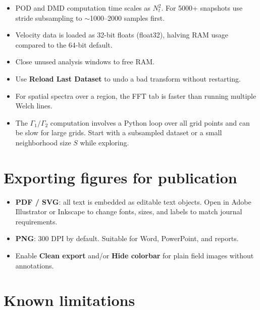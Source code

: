 \documentclass[11pt, a4paper]{report}
\newcommand{\uipth}[1]{\textbf{\textcolor{upblue}{#1}}}
\begin{document}
\begin{itemize}[leftmargin=1.5em]
  \item POD and DMD computation time scales as $N_t^2$. For 5000+ snapshots use stride subsampling to $\sim$1000--2000 samples first.
  \item Velocity data is loaded as 32-bit floats (float32), halving RAM usage compared to the 64-bit default.
  \item Close unused analysis windows to free RAM.
  \item Use \uipth{Reload Last Dataset} to undo a bad transform without restarting.
  \item For spatial spectra over a region, the FFT tab is faster than running multiple Welch lines.
  \item The $\Gamma_1/\Gamma_2$ computation involves a Python loop over all grid points and can be slow for large grids. Start with a subsampled dataset or a small neighborhood size $S$ while exploring.
\end{itemize}

\section{Exporting figures for publication}

\begin{itemize}[leftmargin=1.5em]
  \item \textbf{PDF / SVG}: all text is embedded as editable text objects. Open in Adobe Illustrator or Inkscape to change fonts, sizes, and labels to match journal requirements.
  \item \textbf{PNG}: 300 DPI by default. Suitable for Word, PowerPoint, and reports.
  \item Enable \uipth{Clean export} and/or \uipth{Hide colorbar} for plain field images without annotations.
\end{itemize}

\section{Known limitations}
\end{document}

